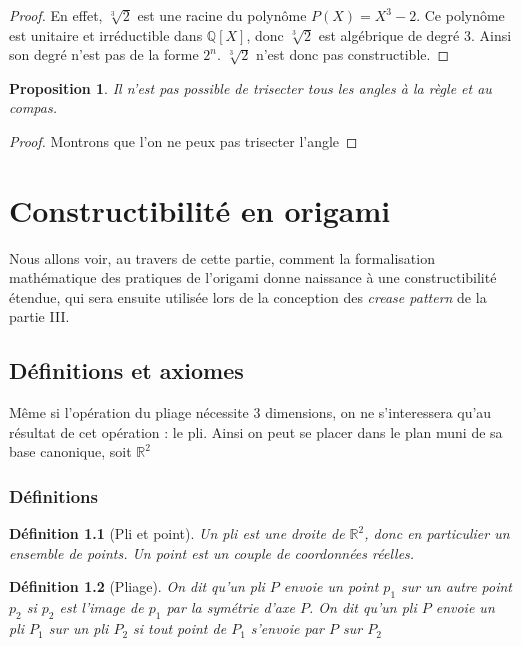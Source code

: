 \documentclass[a4paper,12pt,french]{report}
\newtheorem{proposition}{Proposition}[section]
\newtheorem{definition}{Définition}[section]
\begin{document}
			\begin{proof}
			En effet, 
				\(\sqrt[3]{2}\) est une racine du polynôme 
				\(P(X)=X^{3}-2\). Ce polynôme est unitaire et 
				irréductible dans \(\mathbb{Q}[X]\), donc \(\sqrt[3]{2}\) 
				est algébrique de degré 3. Ainsi son degré n'est pas de 
				la forme \(2^{n}\). \(\sqrt[3]{2}\) n'est donc pas 
				constructible.
			\end{proof}
			
	
	\begin{proposition}
			Il n'est pas possible de trisecter tous les angles à la règle et au compas.
	\end{proposition}
			
			\begin{proof}
				Montrons que l'on ne peux pas trisecter l'angle
			\end{proof}
			
		





\chapter{Constructibilité en origami}
	Nous allons voir, au travers de cette partie, comment la formalisation mathématique des pratiques de l'origami donne naissance à une constructibilité étendue, qui sera ensuite utilisée lors de la conception des \emph{crease pattern} de la partie III.

	\section{Définitions et axiomes}
		Même si l'opération du pliage nécessite 3 dimensions, on ne s'interessera qu'au résultat de cet opération : le pli. Ainsi on peut se placer dans le plan muni de sa base canonique, soit $\mathbb{R}^{2}$
	\subsection{Définitions}
		\begin{definition}[Pli et point]
			Un \emph{pli} est une droite de $\mathbb{R}^{2}$, donc en particulier un ensemble de points. Un \emph{point} est un couple de coordonnées réelles.
		\end{definition}
		\begin{definition}[Pliage]
			On dit qu'un pli $P$ \emph{envoie} un point $p_{1}$ sur un autre point $p_{2}$ si $p_{2}$ est l'image de $p_{1}$ par la symétrie d'axe $P$. On dit qu'un pli $P$ \emph{envoie} un pli $P_{1}$ sur un pli $P_{2}$ si tout point de $P_{1}$ s'envoie par $P$ sur $P_{2}$
		\end{definition}
		
\end{document}
